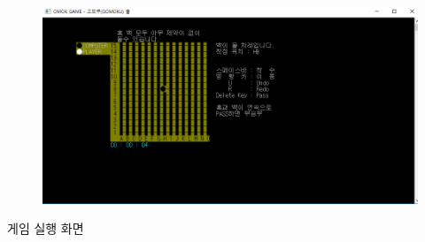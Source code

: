 \documentclass[a4paper, 11pt]{article}
\begin{document}
	\newpage
\begin{figure}[h] %
	\begin{center}
		\includegraphics[width=0.8\linewidth]{third.png}
	\end{center}
	\label{fig:long}
	\label{fig:onecol}
\end{figure}
\begin{center}
	{\Large 게임 실행 화면}
\end{center}
\end{document}
